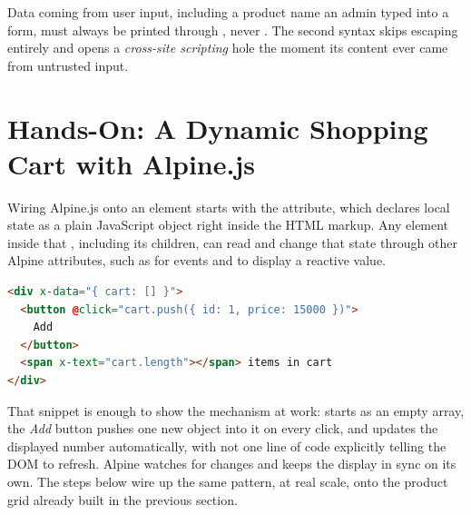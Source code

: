 \begin{warningbox}
Data coming from user input, including a product name an admin typed into
a form, must always be printed through \cmd{\{\{ \}\}}, never
\cmd{\{!! !!\}}. The second syntax skips escaping entirely and opens a
\textit{cross-site scripting} hole the moment its content ever came from
untrusted input.
\end{warningbox}

\section{Hands-On: A Dynamic Shopping Cart with Alpine.js}
\label{sec:blade-dan-tailwind-3}

Wiring Alpine.js onto an element starts with the  attribute,
which declares local state as a plain JavaScript object right inside the
HTML markup. Any element inside that , including its children,
can read and change that state through other Alpine attributes, such as
 for events and  to display a reactive value.

\begin{lstlisting}[language=html]
<div x-data="{ cart: [] }">
  <button @click="cart.push({ id: 1, price: 15000 })">
    Add
  </button>
  <span x-text="cart.length"></span> items in cart
</div>
\end{lstlisting}

That snippet is enough to show the mechanism at work:  starts as
an empty array, the \textit{Add} button pushes one new object into it on
every click, and  updates the displayed number
automatically, with not one line of code explicitly telling the DOM to
refresh. Alpine watches  for changes and keeps the display in
sync on its own. The steps below wire up the same pattern, at real
scale, onto the  product grid already built in the previous
section.

